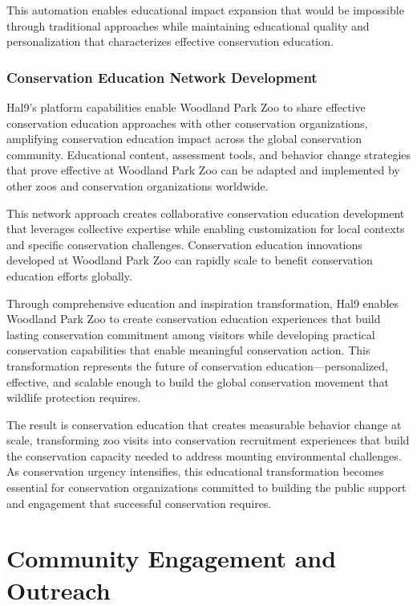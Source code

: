 \documentclass[
  Letterpaper,
]{scrbook}
\begin{document}
This automation enables educational impact expansion that would be
impossible through traditional approaches while maintaining educational
quality and personalization that characterizes effective conservation
education.

\subsection{Conservation Education Network
Development}\label{conservation-education-network-development}

Hal9's platform capabilities enable Woodland Park Zoo to share effective
conservation education approaches with other conservation organizations,
amplifying conservation education impact across the global conservation
community. Educational content, assessment tools, and behavior change
strategies that prove effective at Woodland Park Zoo can be adapted and
implemented by other zoos and conservation organizations worldwide.

This network approach creates collaborative conservation education
development that leverages collective expertise while enabling
customization for local contexts and specific conservation challenges.
Conservation education innovations developed at Woodland Park Zoo can
rapidly scale to benefit conservation education efforts globally.

Through comprehensive education and inspiration transformation, Hal9
enables Woodland Park Zoo to create conservation education experiences
that build lasting conservation commitment among visitors while
developing practical conservation capabilities that enable meaningful
conservation action. This transformation represents the future of
conservation education---personalized, effective, and scalable enough to
build the global conservation movement that wildlife protection
requires.

The result is conservation education that creates measurable behavior
change at scale, transforming zoo visits into conservation recruitment
experiences that build the conservation capacity needed to address
mounting environmental challenges. As conservation urgency intensifies,
this educational transformation becomes essential for conservation
organizations committed to building the public support and engagement
that successful conservation requires.


\chapter{Community Engagement and
Outreach}\label{community-engagement-and-outreach}
\end{document}
